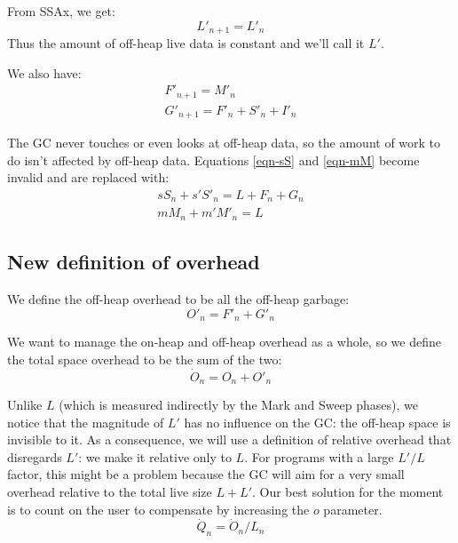 \documentclass{article}
\begin{document}
From SSAx, we get:
\begin{equation}
L'_{n+1} = L'_n
\end{equation}
Thus the amount of off-heap live data is constant and we'll call it
$L'$.

We also have:
\begin{gather}
F'_{n+1} = M'_n    \label{eqn-F'} \\
G'_{n+1} = F'_n + S'_n + I'_n   \label{eqn-G'}
\end{gather}

The GC never touches or even looks at off-heap data, so the amount of
work to do isn't affected by off-heap data. Equations \eqref{eqn-sS} and
\eqref{eqn-mM} become invalid and are replaced with:
\begin{gather}
 sS_n + s'S'_n = L + F_n + G_n   \label{eqn-sS'} \\
 mM_n + m'M'_n = L   \label{eqn-mM'}
\end{gather}


\subsection{New definition of overhead}

We define the off-heap overhead to be all the off-heap garbage:
\begin{equation}\label{def-O'}
O'_n = F'_n + G'_n
\end{equation}


We want to manage the on-heap and off-heap overhead as a whole, so we
define the total space overhead to be the sum of the two:
\begin{equation}\label{def-Odot}
 \dot{O}_n = O_n + O'_n
\end{equation}

Unlike $L$ (which is measured indirectly by the Mark and Sweep
phases), we notice that the magnitude of $L'$ has no influence on the
GC: the off-heap space is invisible to it. As a consequence, we will
use a definition of relative overhead that disregards $L'$: we make it
relative only to $L$.
For programs with a large $L'/L$ factor, this might be a problem because
the GC will aim for a very small overhead relative to the total live
size $L+L'$. Our best solution for the moment is to count on the user
to compensate by increasing the $o$ parameter.
\begin{equation}\label{def-Qdot}
\dot{Q}_n = \dot{O}_n / L_n
\end{equation}
\end{document}
